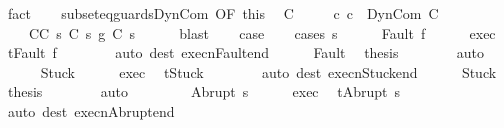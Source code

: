 \begin{isabellebody}
\ fact\isanewline
\ \ \isamarkupfalse%
\ subseteq{\isacharunderscore}guards{\isacharunderscore}DynCom\ {\isacharbrackleft}OF\ this{\isacharbrackright}\ \isamarkupfalse%
\ C\ \isanewline
\ \ \ \ c{\isacharcolon}\ {\isachardoublequoteopen}c\ {\isacharequal}\ DynCom\ C{\isachardoublequoteclose}\ \isanewline
\ \ \ \ C{\isacharunderscore}C{\isacharprime}{\isacharcolon}\ {\isachardoublequoteopen}{\isasymforall}s{\isachardot}\ C\ s\ {\isasymsubseteq}\isactrlsub g\ C{\isacharprime}\ s{\isachardoublequoteclose}\isanewline
\ \ \ \ \isamarkupfalse%
\ blast\isanewline
\ \ \isamarkupfalse%
\ {\isacharquery}case\isanewline
\ \ \isamarkupfalse%
\ {\isacharparenleft}cases\ {\isachardoublequoteopen}s{\isachardoublequoteclose}{\isacharparenright}\isanewline
\ \ \ \ \isamarkupfalse%
\ {\isacharparenleft}Fault\ f{\isacharparenright}\isanewline
\ \ \ \ \isamarkupfalse%
\ exec\ \isamarkupfalse%
\ {\isachardoublequoteopen}t{\isacharequal}Fault\ f{\isachardoublequoteclose}\isanewline
\ \ \ \ \ \ \isamarkupfalse%
\ {\isacharparenleft}auto\ dest{\isacharcolon}\ execn{\isacharunderscore}Fault{\isacharunderscore}end{\isacharparenright}\isanewline
\ \ \ \ \isamarkupfalse%
\ Fault\ \isamarkupfalse%
\ {\isacharquery}thesis\isanewline
\ \ \ \ \ \ \isamarkupfalse%
\ auto\isanewline
\ \ \isamarkupfalse%
\isanewline
\ \ \ \ \isamarkupfalse%
\ Stuck\isanewline
\ \ \ \ \isamarkupfalse%
\ exec\ \isamarkupfalse%
\ {\isachardoublequoteopen}t{\isacharequal}Stuck{\isachardoublequoteclose}\isanewline
\ \ \ \ \ \ \isamarkupfalse%
\ {\isacharparenleft}auto\ dest{\isacharcolon}\ execn{\isacharunderscore}Stuck{\isacharunderscore}end{\isacharparenright}\isanewline
\ \ \ \ \isamarkupfalse%
\ Stuck\ \isamarkupfalse%
\ {\isacharquery}thesis\isanewline
\ \ \ \ \ \ \isamarkupfalse%
\ auto\isanewline
\ \ \isamarkupfalse%
\isanewline
\ \ \ \ \isamarkupfalse%
\ {\isacharparenleft}Abrupt\ s{\isacharprime}{\isacharparenright}\isanewline
\ \ \ \ \isamarkupfalse%
\ exec\ \isamarkupfalse%
\ {\isachardoublequoteopen}t{\isacharequal}Abrupt\ s{\isacharprime}{\isachardoublequoteclose}\isanewline
\ \ \ \ \ \ \isamarkupfalse%
\ {\isacharparenleft}auto\ dest{\isacharcolon}\ execn{\isacharunderscore}Abrupt{\isacharunderscore}end{\isacharparenright}\isanewline

\end{isabellebody}
